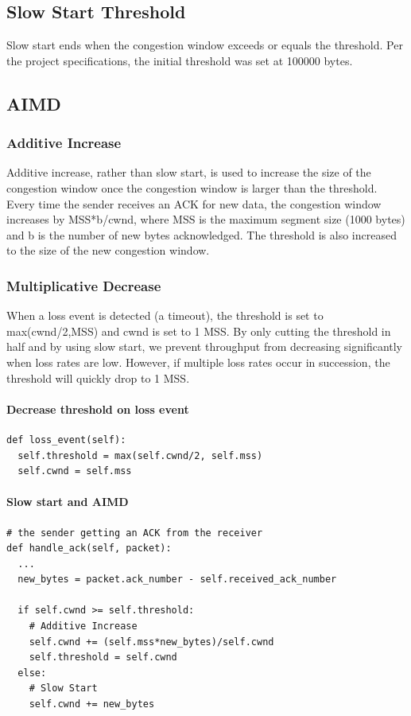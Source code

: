 \documentclass[11pt]{article}
\begin{document}
\subsection{Slow Start Threshold}
Slow start ends when the congestion window exceeds or equals the threshold. Per the project specifications, the initial threshold was set at 100000 bytes.

\subsection{AIMD}
\subsubsection{Additive Increase}
Additive increase, rather than slow start, is used to increase the size of the congestion window once the congestion window is larger than the threshold. Every time the sender receives an ACK for new data, the congestion window increases by MSS*b/cwnd, where MSS is the maximum segment size (1000 bytes) and b is the number of new bytes acknowledged. The threshold is also increased to the size of the new congestion window.
\subsubsection{Multiplicative Decrease}
When a loss event is detected (a timeout), the threshold is set to max(cwnd/2,MSS) and cwnd is set to 1 MSS. By only cutting the threshold in half and by using slow start, we prevent throughput from decreasing significantly when loss rates are low. However, if multiple loss rates occur in succession, the threshold will quickly drop to 1 MSS.
\paragraph{Decrease threshold on loss event} \hspace{2mm}
\begin{lstlisting}
def loss_event(self):
  self.threshold = max(self.cwnd/2, self.mss)
  self.cwnd = self.mss
\end{lstlisting}

\paragraph{Slow start and AIMD} \hspace{2mm}
\begin{lstlisting}
# the sender getting an ACK from the receiver
def handle_ack(self, packet):
  ...
  new_bytes = packet.ack_number - self.received_ack_number

  if self.cwnd >= self.threshold:
    # Additive Increase
    self.cwnd += (self.mss*new_bytes)/self.cwnd
    self.threshold = self.cwnd
  else:
    # Slow Start
    self.cwnd += new_bytes
\end{lstlisting}
\end{document}
